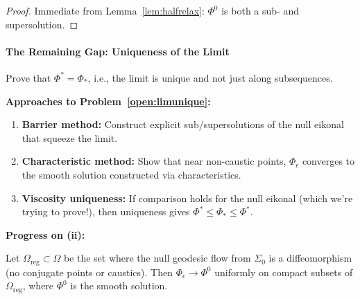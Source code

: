 \begin{proof}
Immediate from Lemma~\ref{lem:halfrelax}: $\Phi^0$ is both a sub- and supersolution.
\end{proof}

\paragraph{The Remaining Gap: Uniqueness of the Limit}

\begin{openproblem}\label{open:limunique}
Prove that $\Phi^* = \Phi_*$, i.e., the limit is unique and not just along subsequences.
\end{openproblem}

\textbf{Approaches to Problem~\ref{open:limunique}:}

\begin{enumerate}
    \item[\textbf{(i)}] \textbf{Barrier method:} Construct explicit sub/supersolutions of the null eikonal that squeeze the limit.
    
    \item[\textbf{(ii)}] \textbf{Characteristic method:} Show that near non-caustic points, $\Phi_\epsilon$ converges to the smooth solution constructed via characteristics.
    
    \item[\textbf{(iii)}] \textbf{Viscosity uniqueness:} If comparison holds for the null eikonal (which we're trying to prove!), then uniqueness gives $\Phi^* \leq \Phi_* \leq \Phi^*$.
\end{enumerate}

\textbf{Progress on (ii):}

\begin{lemma}\label{lem:awaycaustic}
Let $\Omega_{\text{reg}} \subset \Omega$ be the set where the null geodesic flow from $\Sigma_0$ is a diffeomorphism (no conjugate points or caustics). Then $\Phi_\epsilon \to \Phi^0$ uniformly on compact subsets of $\Omega_{\text{reg}}$, where $\Phi^0$ is the smooth solution.
\end{lemma}

